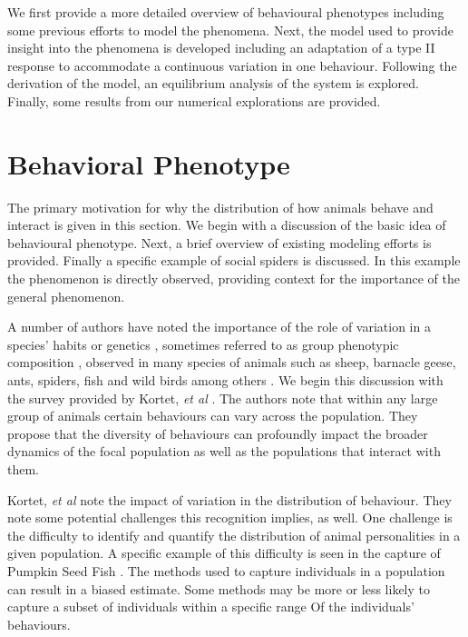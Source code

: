 \documentclass[review]{elsarticle}
\begin{document}
We first provide a more detailed overview of behavioural phenotypes
including some previous efforts to model the phenomena. Next, the
model used to provide insight into the phenomena is developed
including an adaptation of a type II response to accommodate a continuous
variation in one behaviour. Following the derivation of the model, an equilibrium analysis of the system is explored. Finally, some results from our numerical explorations are provided.

\section{Behavioral Phenotype}
\label{section:behaviouralPhenotype}

The primary motivation for why the distribution of how animals behave
and interact is given in this section. We begin with a discussion of
the basic idea of behavioural phenotype. Next, a brief overview of
existing modeling efforts is provided. Finally a specific example of
social spiders is discussed. In this example the phenomenon
is
directly observed, providing context for the importance of the
general phenomenon.

A number of authors have noted the importance of the role of variation
in a species' habits or
genetics \cite{doi:10.1111/j.1461-0248.2010.01536.x,doi:10.1086/687235,mierzejewski_horn_luong_2019,SANTICCHIA20191,doi:10.1098/rspb.2014.1016}, sometimes referred to as group phenotypic composition \cite{FARINE2015609}, observed in many species of animals such as sheep, barnacle geese, ants, spiders, fish and wild birds among others \cite{sibbald2009individual,kurvers2011effect,modlmeier2012diverse,doi:10.1086/687235,doi:10.1098/rspb.2014.1016,doi:10.1037/0735-7036.107.3.250}.
We begin this discussion with the survey provided by Kortet, \textit{et
  al} \cite{doi:10.1111/j.1461-0248.2010.01536.x}. The authors note
that within any large group of animals certain behaviours can vary
across the population. They  propose that the diversity of
behaviours can profoundly impact the broader dynamics of the focal population as well as the populations that interact with them.

Kortet, \textit{et al} \cite{doi:10.1111/j.1461-0248.2010.01536.x} note
the impact of variation in the distribution of behaviour. They note
some potential challenges this recognition implies, as well. One
challenge is the difficulty to identify and quantify the distribution
of animal personalities in a given population. A specific example of this difficulty
is seen in the capture of Pumpkin Seed
Fish \cite{doi:10.1037/0735-7036.107.3.250}. The methods used to
capture individuals in a population can result in a biased estimate.
Some methods may be more or less likely to capture a subset of
individuals within a specific range Of the individuals' behaviours.
\end{document}
